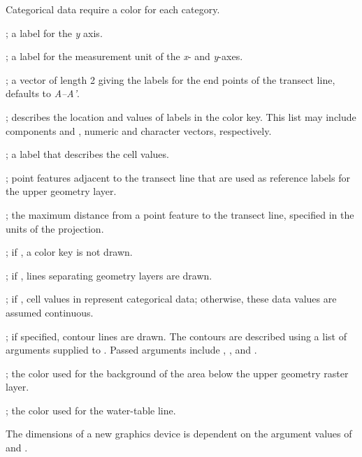 \documentclass[a4paper]{book}
\begin{document}
\begin{Arguments}
\begin{ldescription}
Categorical data require a color for each category.
\item[\code{ylab}] ; a label for the \emph{y} axis.
\item[\code{unit}] ; a label for the measurement unit of the \emph{x}- and \emph{y}-axes.
\item[\code{id}] ; a vector of length 2 giving the labels for the end points of the transect line, defaults to \emph{A--A'}.
\item[\code{labels}] ; describes the location and values of labels in the color key.
This list may include components  and , numeric and character vectors, respectively.
\item[\code{explanation}] ; a label that describes the cell values.
\item[\code{features}] ; point features adjacent to the transect line that are used as reference labels for the upper geometry layer.
\item[\code{max.feature.dist}] ; the maximum distance from a point feature to the transect line, specified in the units of the  projection.
\item[\code{draw.key}] ; if , a color key is not drawn.
\item[\code{draw.sep}] ; if , lines separating geometry layers are drawn.
\item[\code{is.categorical}] ; if , cell values in  represent categorical data; otherwise, these data values are assumed continuous.
\item[\code{contour.lines}] ; if specified, contour lines are drawn.
The contours are described using a list of arguments supplied to .
Passed arguments include , , and .
\item[\code{bg.col}] ; the color used for the background of the area below the upper geometry raster layer.
\item[\code{wt.col}] ; the color used for the water-table line.
\end{ldescription}
\end{Arguments}
%
\begin{Details}\relax
The dimensions of a new graphics device is dependent on the argument values of  and .
\end{Details}
\end{document}
